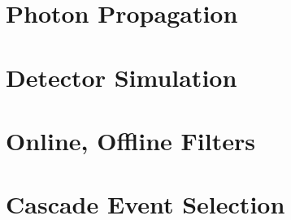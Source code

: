 \documentclass[main.tex]{subfiles}
\begin{document}
\section{Photon Propagation}

\section{Detector Simulation}

\section{Online, Offline Filters}

\section{Cascade Event Selection}
\end{document}
